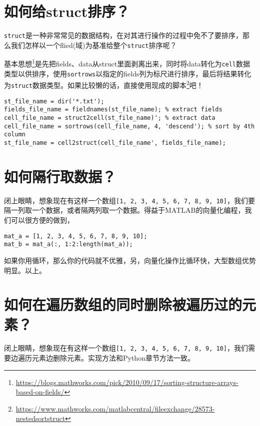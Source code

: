 \section{如何给struct排序？}

\texttt{struct}是一种非常常见的数据结构，在对其进行操作的过程中免不了要排序，那么我们怎样以一个flied(域)为基准给整个\texttt{struct}排序呢？

基本思想\footnote{\url{https://blogs.mathworks.com/pick/2010/09/17/sorting-structure-arrays-based-on-fields/}}是先把fields、data从struct里面剥离出来，同时将data转化为\texttt{cell}数据类型以供排序，使用\texttt{sortrows}以指定的fields列为标尺进行排序，最后将结果转化为\texttt{struct}数据类型。如果比较懒的话，直接使用现成的脚本\footnote{\url{https://www.mathworks.com/matlabcentral/fileexchange/28573-nestedsortstruct}}吧！

\begin{verbatim}
st_file_name = dir('*.txt');
fields_file_name = fieldnames(st_file_name); % extract fields
cell_file_name = struct2cell(st_file_name)'; % extract data
cell_file_name = sortrows(cell_file_name, 4, 'descend'); % sort by 4th column
st_file_name = cell2struct(cell_file_name', fields_file_name);
\end{verbatim}

\section{如何隔行取数据？}

闭上眼睛，想象现在有这样一个数组\texttt{[1, 2, 3, 4, 5, 6, 7, 8, 9, 10]}，我们要隔一列取一个数据，或者隔两列取一个数据。得益于MATLAB的向量化编程，我们可以很方便的做到，

\begin{verbatim}
mat_a = [1, 2, 3, 4, 5, 6, 7, 8, 9, 10];
mat_b = mat_a(:, 1:2:length(mat_a));
\end{verbatim}

如果你用循环，那么你的代码就不优雅，另，向量化操作比循环快，大型数组优势明显。以上。

\section{如何在遍历数组的同时删除被遍历过的元素？}

闭上眼睛，想象现在有这样一个数组\texttt{[1, 2, 3, 4, 5, 6, 7, 8, 9, 10]}，我们需要边遍历元素边删除元素。实现方法和Python章节方法一致。

